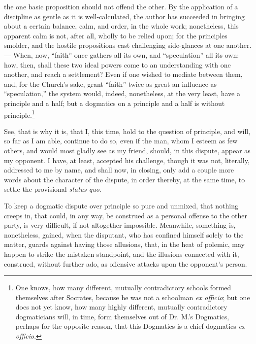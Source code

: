 \documentclass[12pt]{book}
\begin{document}
the one basic proposition should not offend the other. By the application of a discipline as gentle as it is well-calculated, the author has succeeded in bringing about a certain balance, calm, and order, in the whole work; nonetheless, this apparent calm is not, after all, wholly to be relied upon; for the principles smolder, and the hostile propositions cast challenging side-glances at one another. --- When, now, ``faith'' once gathers all its own, and ``speculation'' all its own: how, then, shall these two ideal powers come to an understanding with one another, and reach a settlement? Even if one wished to mediate between them, and, for the Church's sake, grant ``faith'' twice as great an influence as ``speculation,'' the system would, indeed, nonetheless, at the very least, have a principle and a half; but a dogmatics on a principle and a half is without principle.\footnote{One knows, how many different, mutually contradictory schools formed themselves after Socrates, because he was not a schoolman \textit{ex officio}; but one does not yet know, how many highly different, mutually contradictory dogmaticians will, in time, form themselves out of Dr. M.'s Dogmatics, perhaps for the opposite reason, that this Dogmatics is a chief dogmatics \textit{ex officio}.}

See, that is why it is, that I, this time, hold to the question of principle, and will, so far as I am able, continue to do so, even if the man, whom I esteem as few others, and would most gladly see as my friend, should, in this dispute, appear as my opponent. I have, at least, accepted his challenge, though it was not, literally,
addressed to me by name, and shall now, in closing, only add a couple more words about the character of the dispute, in order thereby, at the same time, to settle the provisional \textit{status quo}.

To keep a dogmatic dispute over principle so pure and unmixed, that nothing creeps in, that could, in any way, be construed as a personal offense to the other party, is very difficult, if not altogether impossible. Meanwhile, something is, nonetheless, gained, when the disputant, who has confined himself solely to the matter, guards against having those allusions, that, in the heat of polemic, may happen to strike the mistaken standpoint, and the illusions connected with it, construed, without further ado, as offensive attacks upon the opponent's person.
\end{document}
